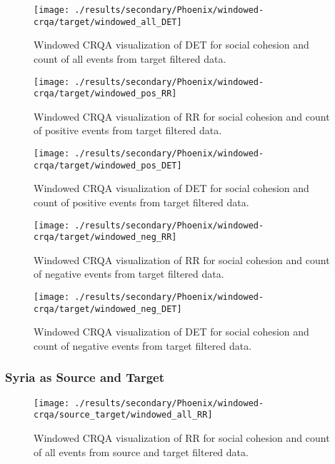 \documentclass[english,man]{apa6}
\begin{document}
\begin{figure}
\texttt{[image: ./results/secondary/Phoenix/windowed-crqa/target/windowed\_all\_DET]} \caption{Windowed CRQA visualization of DET for social cohesion and count of all events from target filtered data.}\label{fig:plot-DET-targ-all-secondary-Phoenix}
\end{figure}

\begin{figure}
\texttt{[image: ./results/secondary/Phoenix/windowed-crqa/target/windowed\_pos\_RR]} \caption{Windowed CRQA visualization of RR for social cohesion and count of positive events from target filtered data.}\label{fig:plot-RR-targ-pos-secondary-Phoenix}
\end{figure}

\begin{figure}
\texttt{[image: ./results/secondary/Phoenix/windowed-crqa/target/windowed\_pos\_DET]} \caption{Windowed CRQA visualization of DET for social cohesion and count of positive events from target filtered data.}\label{fig:plot-DET-targ-pos-secondary-Phoenix}
\end{figure}

\begin{figure}
\texttt{[image: ./results/secondary/Phoenix/windowed-crqa/target/windowed\_neg\_RR]} \caption{Windowed CRQA visualization of RR for social cohesion and count of negative events from target filtered data.}\label{fig:plot-RR-targ-neg-secondary-Phoenix}
\end{figure}

\begin{figure}
\texttt{[image: ./results/secondary/Phoenix/windowed-crqa/target/windowed\_neg\_DET]} \caption{Windowed CRQA visualization of DET for social cohesion and count of negative events from target filtered data.}\label{fig:plot-DET-targ-neg-secondary-Phoenix}
\end{figure}

\hypertarget{syria-as-source-and-target-4}{%
\subsubsection{Syria as Source and Target}\label{syria-as-source-and-target-4}}

\begin{figure}
\texttt{[image: ./results/secondary/Phoenix/windowed-crqa/source\_target/windowed\_all\_RR]} \caption{Windowed CRQA visualization of RR for social cohesion and count of all events from source and target filtered data.}\label{fig:plot-RR-source-targ-all-secondary-Phoenix}
\end{figure}
\end{document}

